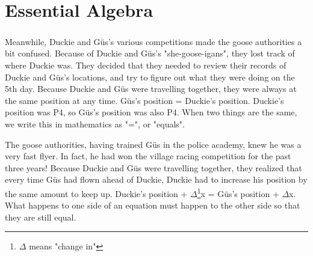 \chapter{Essential Algebra}
\paragraph{} Meanwhile, Duckie and Güs's various competitions made the goose authorities a bit confused. Because of Duckie and Güs's "she-goose-igans", they lost track of where Duckie was. They decided that they needed to review their records of Duckie and Güs's locations, and try to figure out what they were doing on the 5th day. 
\vfill
\pagebreak
{Because Duckie and Güs were travelling together, they were always at the same position at any time.}
{Güs's position = Duckie's position. Duckie's position was P4, so Güs's position was also P4.}
{When two things are the same, we write this in mathematics as "=", or "equals".}
{}
{The goose authorities, having trained Güs in the police academy, knew he was a very fast flyer. In fact, he had won the village racing competition for the past three years! Because Duckie and Güs were travelling together, they realized that every time Güs had flown ahead of Duckie, Duckie had to increase his position by the same amount to keep up.}
{Duckie's position + $\Delta$\footnote{$\Delta$ means "change in"}x = Güs's position + $\Delta$x.}
{What happens to one side of an equation must happen to the other side so that they are still equal.}
